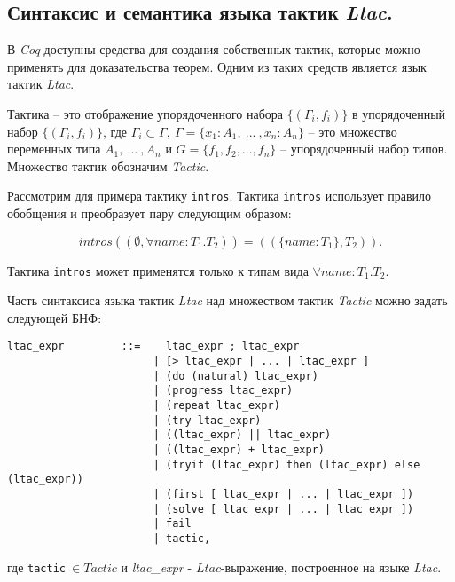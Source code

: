 \documentclass[12pt]{article}
\begin{document}
\subsection{Синтаксис и семантика языка тактик \textit{Ltac}.}

В \textit{Coq} доступны средства для создания собственных тактик, которые можно применять для доказательства теорем. Одним из таких средств является язык тактик \textit{Ltac}. 

Тактика -- это отображение упорядоченного набора $\{(\Gamma_i, f_i)\}$ в упорядоченный набор $\{(\Gamma_i, f_i)\}$, где
$\Gamma_i \subset \Gamma,\ \Gamma = \{x_1:A_1,\ ...\ , x_n:A_n\}$ -- это множество переменных типа $A_1,\ ...\ , A_n$ и $G= \{f_1, f_2, ..., f_n\}$ -- упорядоченный набор типов. Множество тактик обозначим \textit{Tactic}.

Рассмотрим для примера тактику \verb|intros|. Тактика \verb|intros| использует правило обобщения и преобразует пару следующим образом:

$$intros((\emptyset, \forall name: T_1. T_2)) = ((\{name:T_1\}, T_2)).$$

Тактика \verb|intros| может применятся только к типам вида $\forall name: T_1. T_2$.

Часть синтаксиса  языка тактик \textit{Ltac} над множеством тактик \textit{Tactic} можно задать следующей БНФ:

\makeatletter
\def\verbatim@font{\linespread{1}\normalfont\ttfamily}
\makeatother
\begin{verbatim}
ltac_expr         ::=    ltac_expr ; ltac_expr
                       | [> ltac_expr | ... | ltac_expr ]
                       | (do (natural) ltac_expr)
                       | (progress ltac_expr)
                       | (repeat ltac_expr)
                       | (try ltac_expr)
                       | ((ltac_expr) || ltac_expr)
                       | ((ltac_expr) + ltac_expr)
                       | (tryif (ltac_expr) then (ltac_expr) else (ltac_expr))
                       | (first [ ltac_expr | ... | ltac_expr ])
                       | (solve [ ltac_expr | ... | ltac_expr ])
                       | fail
                       | tactic,
\end{verbatim}
где \verb|tactic|$\ \in Tactic$ и \textit{ltac\_expr} - $Ltac$-выражение, построенное на языке \textit{Ltac}. 




    
\end{document}
